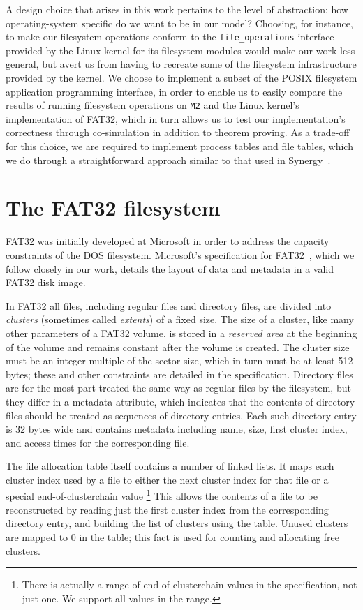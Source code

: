 \documentclass[submission,copyright,creativecommons]{eptcs}
\begin{document}
A design choice that arises in this work pertains to the level of
abstraction: how operating-system specific do we want to be in our
model? Choosing, for instance, to make our filesystem operations
conform to the \texttt{file\_operations} interface provided by the
Linux kernel for its filesystem modules would make our work less
general, but avert us from having to recreate some of the filesystem
infrastructure provided by the kernel. We choose to implement a subset
of the POSIX filesystem application
programming interface, in order to enable us to easily compare the
results of running filesystem operations on \texttt{M2} and the Linux
kernel's implementation of FAT32, which in turn allows us to test our
implementation's correctness through co-simulation in addition to
theorem proving. As a trade-off for this choice, we are required to
implement process tables and file tables, which we do through a
straightforward approach similar to that used in
Synergy~\cite{bevier1996executable}.

\section{The FAT32 filesystem}

FAT32 was initially developed at Microsoft in order to address the
capacity constraints of the DOS filesystem. Microsoft's specification
for FAT32~\cite{microsoft2000}, which we follow closely in our work,
details the layout of data and metadata in a valid FAT32 disk image.

In FAT32 all files, including regular files and directory files, are
divided into \textit{clusters} (sometimes called \textit{extents}) of
a fixed size. The size of a cluster, like many other parameters
of a FAT32 volume, is stored in a \textit{reserved area} at the
beginning of the volume and remains constant after the volume is
created. The cluster size must be an integer multiple of the sector
size, which in turn must be at least 512 bytes; these and other
constraints are detailed in the specification. Directory
files are for the most part treated the same way as regular files by
the filesystem, but they differ in a metadata attribute, which
indicates that the contents of directory files should be treated as
sequences of directory entries. Each such directory entry is
32 bytes wide and contains metadata including name, size, first
cluster index, and access times for the corresponding file.

The file allocation table itself contains a number of linked lists. It
maps each cluster index used by a file to either the next cluster
index for that file or a special end-of-clusterchain value \footnote{
There is actually a range of end-of-clusterchain values in the
specification, not just one. We support all values in the range.} This
allows the contents of a file to be reconstructed by
reading just the first cluster index from the corresponding directory
entry, and building the list of clusters using the table. Unused
clusters are mapped to 0 in the table; this fact is used for counting
and allocating free clusters.
\end{document}
